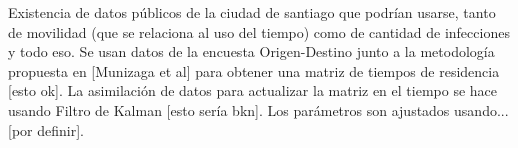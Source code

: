 Existencia de datos públicos de la ciudad de santiago que podrían usarse, tanto de movilidad (que se relaciona al uso del tiempo) como de cantidad de infecciones y todo eso. 
Se usan datos de la encuesta Origen-Destino junto a la metodología propuesta en [Munizaga et al] para obtener una matriz de tiempos de residencia [esto ok]. La asimilación de datos para actualizar la matriz en el tiempo se hace usando Filtro de Kalman [esto sería bkn]. Los parámetros son ajustados usando... [por definir]. 



%
%




